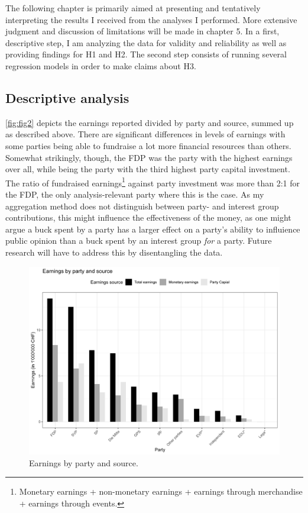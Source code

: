 \documentclass[11pt,a4paper]{article}
\begin{document}
The following chapter is primarily aimed at presenting and tentatively interpreting the results I received from the analyses I performed. More extensive judgment and discussion of limitations will be made in chapter 5. In a first, descriptive step, I am analyzing the data for validity and reliability as well as providing findings for H1 and H2. The second step consists of running several regression models in order to make claims about H3.

\subsection{Descriptive analysis}
\autoref{fig:fig2} depicts the earnings reported divided by party and source, summed up as described above. There are significant differences in levels of earnings with some parties being able to fundraise a lot more financial resources than others. Somewhat strikingly, though, the FDP was the party with the highest earnings over all, while being the party with the third highest party capital investment. The ratio of fundraised earnings\footnote{Monetary earnings + non-monetary earnings + earnings through merchandise + earnings through events.} against party investment was more than 2:1 for the FDP, the only analysis-relevant party where this is the case. As my aggregation method does not distinguish between party- and interest group contributions, this might influence the effectiveness of the money, as one might argue a buck spent by a party has a larger effect on a party’s ability to influience public opinion than a buck spent by an interest group \textit{for} a party. Future research will have to address this by disentangling the data.

\begin{figure}
    \centering
    \includegraphics[width=1\linewidth]{output/plots/plot_figure_2.png}
    \caption{Earnings by party and source.}
    \label{fig:fig2}
\end{figure}
\end{document}
